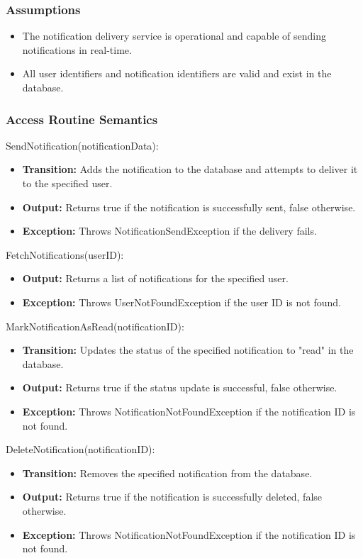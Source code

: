 \documentclass[12pt, titlepage]{article}
\begin{document}
\subsubsection{Assumptions}

\begin{itemize}
  \item The notification delivery service is operational and capable of sending notifications in real-time.
  \item All user identifiers and notification identifiers are valid and exist in the database.
\end{itemize}

\subsubsection{Access Routine Semantics}

\noindent SendNotification(notificationData):
\begin{itemize}
  \item \textbf{Transition:} Adds the notification to the database and attempts to deliver it to the specified user.
  \item \textbf{Output:} Returns true if the notification is successfully sent, false otherwise.
  \item \textbf{Exception:} Throws NotificationSendException if the delivery fails.
\end{itemize}

\noindent FetchNotifications(userID):
\begin{itemize}
  \item \textbf{Output:} Returns a list of notifications for the specified user.
  \item \textbf{Exception:} Throws UserNotFoundException if the user ID is not found.
\end{itemize}

\noindent MarkNotificationAsRead(notificationID):
\begin{itemize}
  \item \textbf{Transition:} Updates the status of the specified notification to "read" in the database.
  \item \textbf{Output:} Returns true if the status update is successful, false otherwise.
  \item \textbf{Exception:} Throws NotificationNotFoundException if the notification ID is not found.
\end{itemize}

\noindent DeleteNotification(notificationID):
\begin{itemize}
  \item \textbf{Transition:} Removes the specified notification from the database.
  \item \textbf{Output:} Returns true if the notification is successfully deleted, false otherwise.
  \item \textbf{Exception:} Throws NotificationNotFoundException if the notification ID is not found.
\end{itemize}
\end{document}
